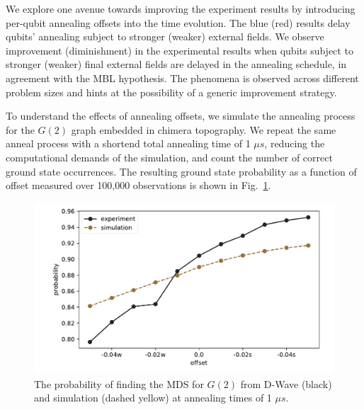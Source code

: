 \documentclass[10pt]{iopart}
\begin{document}
We explore one avenue towards improving the experiment results by introducing per-qubit annealing offsets into the time evolution.
The blue (red) results delay qubits' annealing subject to stronger (weaker) external fields. We observe improvement (diminishment) in the experimental results when qubits subject to stronger (weaker) final external fields are delayed in the annealing schedule, in agreement with the MBL hypothesis. The phenomena is observed across different problem sizes and hints at the possibility of a generic improvement strategy.

To understand the effects of annealing offsets, we simulate the annealing process for the $G(2)$ graph embedded in chimera topography.
We repeat the same anneal process with a shortend total annealing time of 1 $\mu s$, reducing the computational demands of the simulation, and count the number of correct ground state occurrences.
The resulting ground state probability as a function of offset measured over 100,000 observations is shown in Fig.~\ref{fig:dwave1us}.

\begin{figure}[b]
	\centering
	\includegraphics[width=\columnwidth]{./new_figures/NN2_offset_scaling.pdf}
	\caption{The probability of finding the MDS for $G(2)$ from D-Wave (black) and simulation (dashed yellow) at annealing times of 1 $\mu s$.}
	\label{fig:dwave1us}
\end{figure}
\end{document}
